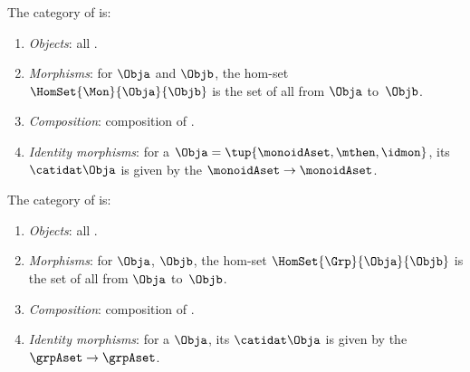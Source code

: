 \begin{ctdefinition}
    \label{def:Mon}
    The category \Mon of  is:
    \begin{enumerate}
        \item \emph{Objects}: all .
        \item \emph{Morphisms}: for  $\Obja$ and $\Objb$, %
              the hom-set $\HomSet{\Mon}{\Obja}{\Objb}$ is the set of all  from $\Obja$ to~$\Objb$.
        \item \emph{Composition}: composition of .
        \item \emph{Identity morphisms}: for a  $\Obja = \tup{\monoidAset, {{\mthen}}, \idmon}$, its  $\catidat\Obja$ is given by the  $\monoidAset \to \monoidAset$.
    \end{enumerate}
\end{ctdefinition}

\begin{ctdefinition}
    \label{def:Grp}
    The category \Grp of  is:
    \begin{enumerate}
        \item \emph{Objects}: all .
        \item \emph{Morphisms}: for  $\Obja$, $\Objb$, %
              the hom-set $\HomSet{\Grp}{\Obja}{\Objb}$ is the set of all  from $\Obja$ to~$\Objb$.
        \item \emph{Composition}: composition of .
        \item \emph{Identity morphisms}: for a  $\Obja$, its  $\catidat\Obja$ is given by the  $\grpAset \to \grpAset$.
    \end{enumerate}
\end{ctdefinition}
